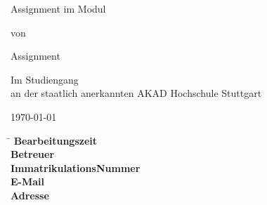 \begin{titlepage}
\begin{center}
\thispagestyle{empty}

\Large{\textbf{\Title}}
\vspace{1cm}
\onehalfspacing

\large{Assignment im Modul \Module}

\vspace{1cm}
\normalsize

von

\vspace{.5cm} 
\large{\Name}
\normalsize
\vspace{1cm}

Assignment \\
\textbf{\Degree}
\vspace{1cm}

Im Studiengang \CourseOfStudy \\
an der staatlich anerkannten AKAD Hochschule Stuttgart
\vspace{2cm}

\today



\end{center}

\vfill
\begin{spacing}{1.2}
    \begin{tabbing}
	    \hspace{9cm}     \= \kill
	    \textbf{Bearbeitungszeit}  \>  \ProcessingTime \\
	    \textbf{Betreuer}              \>  \Supervisor \\
	    \textbf{ImmatrikulationsNummer}  \>  \RegistrationNumber \\
	    \textbf{E-Mail}		\> \href{mailto:\Email}{\Email} \\
	    \textbf{Adresse}		\> \Address \\
	    		\> \City
	\end{tabbing}
\end{spacing}
\restoregeometry
\end{titlepage}